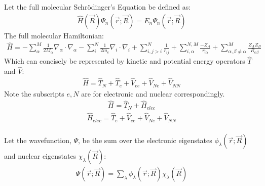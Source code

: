     Let the full molecular Schrödinger's Equation be defined as: 
\begin{equation}\label{eq:schrodinger}
    \begin{split}
        \hat{H}(\Vec{R}) \Psi_{n}(\Vec{r};\Vec{R}) = E_n \Psi_{n}(\Vec{r};\Vec{R})
    \end{split}
\end{equation}
%
The full molecular Hamiltonian:
\begin{equation}%
    \begin{split}
        \hat{H} = -\sum_{\alpha}^{M} \frac{1}{2M_{\alpha}} \nabla_{\alpha} \cdot \nabla_{\alpha}
         -\sum_{i}^{N} \frac{1}{2m_{e}} \nabla_{i} \cdot \nabla_{i}
         + \sum_{i,j>i}^{N} \frac{1}{r_{ij}} + \sum_{i, \alpha}^{N,M} \frac{-Z_{A}}{r_{i\alpha}}
         + \sum_{\alpha, \beta \neq \alpha}^{M} \frac{Z_{A}Z_{B}}{R_{\alpha \beta}}
    \end{split}
\end{equation}
%
Which can concisely be represented by kinetic and potential energy operators $\hat{T}$ and $\hat{V}$:
\begin{equation}%
    \begin{split}
        \hat{H} = \hat{T}_{N} + \hat{T}_{e} + \hat{V}_{ee} + \hat{V}_{Ne} + \hat{V}_{NN}
    \end{split}
\end{equation}
%
Note the subscripts $e, N$ are for electronic and nuclear correspondingly.
\begin{equation}%
    \begin{split}
        \hat{H}_{} = \hat{T}_{N} + \hat{H}_{elec} 
    \end{split}
\end{equation}
%
\begin{equation}%
    \begin{split}
        \hat{H}_{elec} = \hat{T}_{e} + \hat{V}_{ee} + \hat{V}_{Ne} + \hat{V}_{NN}
    \end{split}
\end{equation}
\\ Let the wavefunction, $\Psi$, be the sum over the electronic eigenstates $\phi_{\lambda} (\Vec{r};\Vec{R})$ and nuclear eigenstates $\chi_{\lambda} (\Vec{R})$:
\begin{equation}%
    \begin{split}
        \Psi (\Vec{r};\Vec{R}) = \sum_{\lambda} \phi_{\lambda} (\Vec{r};\Vec{R}) \chi_{\lambda} (\Vec{R})
    \end{split}
\end{equation}
